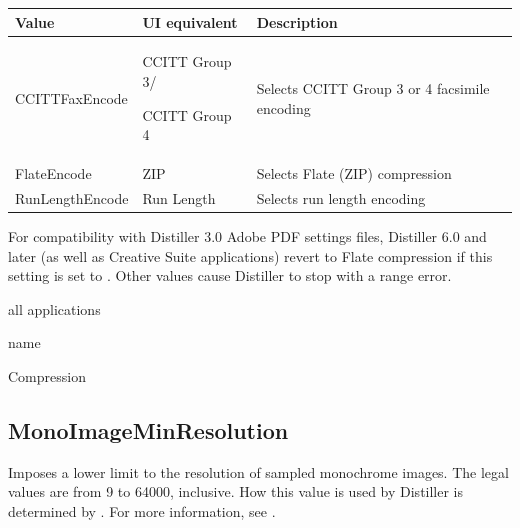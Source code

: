 \documentclass[letterpaper,12pt,english,openany,oneside]{sphinxmanual}
\begin{document}
\begin{savenotes}\sphinxattablestart
\centering
{}\label{\detokenize{PDF_Create_CommonSettings:section-12}}\nobreak
\begin{tabulary}{\linewidth}[t]{|T|T|T|}
\hline
\sphinxstyletheadfamily 
Value
&\sphinxstyletheadfamily 
UI equivalent
&\sphinxstyletheadfamily 
Description
\\
\hline
CCITTFaxEncode
&
CCITT Group 3/

CCITT Group 4
&
Selects CCITT Group 3 or 4 facsimile encoding
\\
\hline
FlateEncode
&
ZIP
&
Selects Flate (ZIP) compression
\\
\hline
RunLengthEncode
&
Run Length
&
Selects run length encoding
\\
\hline
\end{tabulary}
\par
\sphinxattableend\end{savenotes}

For compatibility with Distiller 3.0 Adobe PDF settings files, Distiller 6.0 and later (as well as Creative Suite applications) revert to Flate compression if this setting is set to  . Other values cause Distiller to stop with a range error.

\label{\detokenize{PDF_Create_CommonSettings:supported-by-62}}

all applications

\label{\detokenize{PDF_Create_CommonSettings:type-62}}

name

\label{\detokenize{PDF_Create_CommonSettings:ui-name-48}}

Compression

\label{\detokenize{PDF_Create_CommonSettings:default-value-58}}

\begin{sphinxVerbatim}[commandchars=\\\{\}]
\end{sphinxVerbatim}




\subsection{MonoImageMinResolution}
\label{\detokenize{PDF_Create_CommonSettings:monoimageminresolution}}
Imposes a lower limit to the resolution of sampled monochrome images. The legal values are from 9 to 64000, inclusive. How this value is used by Distiller is determined by  . For more information, see .
\end{document}
